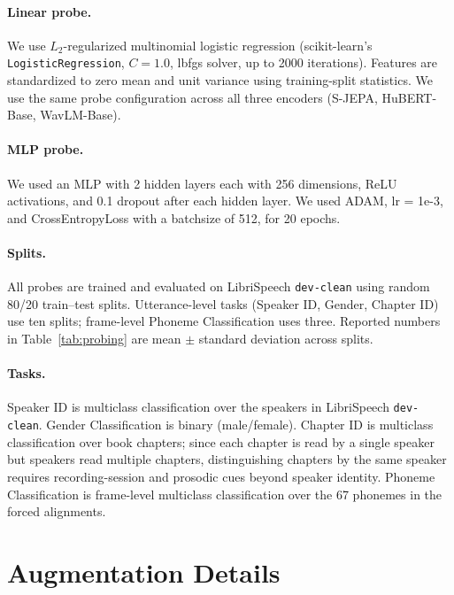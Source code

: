 \documentclass[9pt,twocolumn]{article}
\theoremstyle{plain}
\theoremstyle{definition}
\theoremstyle{remark}
\begin{document}
\paragraph{Linear probe.} We use $L_2$-regularized multinomial logistic regression (scikit-learn's \texttt{LogisticRegression}, $C=1.0$, lbfgs solver, up to 2000 iterations). Features are standardized to zero mean and unit variance using training-split statistics. We use the same probe configuration across all three encoders (S-JEPA, HuBERT-Base, WavLM-Base).
 
\paragraph{MLP probe.} We used an MLP with 2 hidden layers each with 256 dimensions, ReLU activations, and 0.1 dropout after each hidden layer. We used ADAM, lr = 1e-3, and CrossEntropyLoss with a batchsize of 512, for 20 epochs.


 
\paragraph{Splits.} All probes are trained and evaluated on LibriSpeech \texttt{dev-clean} using random 80/20 train--test splits. Utterance-level tasks (Speaker ID, Gender, Chapter ID) use ten splits; frame-level Phoneme Classification uses three. Reported numbers in Table~\ref{tab:probing} are mean $\pm$ standard deviation across splits.

\paragraph{Tasks.} Speaker ID is multiclass classification over the speakers in LibriSpeech \texttt{dev-clean}. Gender Classification is binary (male/female). Chapter ID is multiclass classification over book chapters; since each chapter is read by a single speaker but speakers read multiple chapters, distinguishing chapters by the same speaker requires recording-session and prosodic cues beyond speaker identity. Phoneme Classification is frame-level multiclass classification over the 67 phonemes in the forced alignments.



\section{Augmentation Details}
\label{app:augment}
\end{document}
